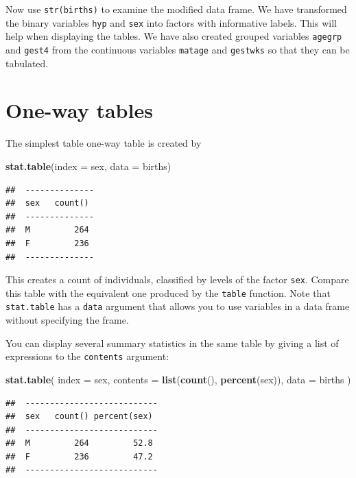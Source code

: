 \documentclass[
]{book}
\newenvironment{Shaded}{\begin{snugshade}}{\end{snugshade}}
\newcommand{\AttributeTok}[1]{\textcolor[rgb]{0.13,0.29,0.53}{#1}}
\newcommand{\FunctionTok}[1]{\textcolor[rgb]{0.13,0.29,0.53}{\textbf{#1}}}
\newcommand{\NormalTok}[1]{#1}
\begin{document}
Now use \texttt{str(births)} to examine the modified data frame. We have
transformed the binary variables \texttt{hyp} and \texttt{sex} into factors
with informative labels. This will help when displaying the tables. We
have also created grouped variables \texttt{agegrp} and \texttt{gest4} from
the continuous variables \texttt{matage} and \texttt{gestwks} so that they
can be tabulated.

\section{One-way tables}\label{one-way-tables}

The simplest table one-way table is created by

\begin{Shaded}
\begin{Highlighting}[]
\FunctionTok{stat.table}\NormalTok{(}\AttributeTok{index =}\NormalTok{ sex, }\AttributeTok{data =}\NormalTok{ births)}
\end{Highlighting}
\end{Shaded}

\begin{verbatim}
##  -------------- 
##  sex   count()  
##  -------------- 
##  M         264  
##  F         236  
##  --------------
\end{verbatim}

This creates a count of individuals, classified by levels of the
factor \texttt{sex}. Compare this table with the equivalent one produced
by the \texttt{table} function. Note that \texttt{stat.table} has a
\texttt{data} argument that allows you to use variables in a data frame without
specifying the frame.

You can display several summary statistics in the same table by
giving a list of expressions to the \texttt{contents} argument:

\begin{Shaded}
\begin{Highlighting}[]
\FunctionTok{stat.table}\NormalTok{(}
  \AttributeTok{index =}\NormalTok{ sex, }
  \AttributeTok{contents =} \FunctionTok{list}\NormalTok{(}\FunctionTok{count}\NormalTok{(), }\FunctionTok{percent}\NormalTok{(sex)), }
  \AttributeTok{data =}\NormalTok{ births}
\NormalTok{)}
\end{Highlighting}
\end{Shaded}

\begin{verbatim}
##  --------------------------- 
##  sex   count() percent(sex)  
##  --------------------------- 
##  M         264         52.8  
##  F         236         47.2  
##  ---------------------------
\end{verbatim}
\end{document}
